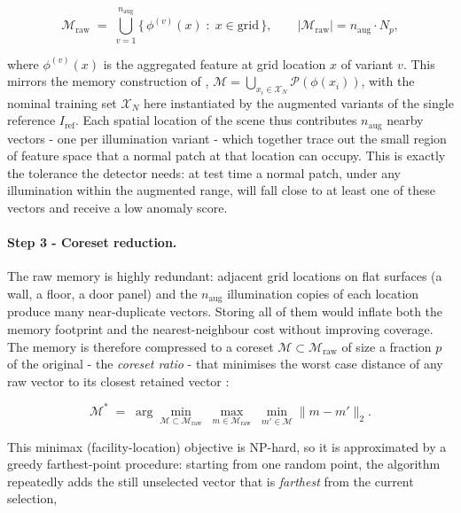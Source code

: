\begin{equation}
  \mathcal{M}_{\mathrm{raw}} \;=\;
  \bigcup_{v=1}^{n_{\mathrm{aug}}} \big\{\, \phi^{(v)}(x) \;:\; x \in \text{grid} \,\big\},
  \qquad
  |\mathcal{M}_{\mathrm{raw}}| = n_{\mathrm{aug}} \cdot N_p ,
  \label{eq:rawmemory}
\end{equation}

where $\phi^{(v)}(x)$ is the aggregated feature at grid location $x$ of variant
$v$. This mirrors the memory construction of \cite{Roth2022},
$\mathcal{M} = \bigcup_{x_i \in \mathcal{X}_N} \mathcal{P}(\phi(x_i))$, with the
nominal training set $\mathcal{X}_N$ here instantiated by the augmented variants
of the single reference $I_{\mathrm{ref}}$. Each spatial location of the scene
thus contributes $n_{\mathrm{aug}}$ nearby vectors - one per illumination variant -
which together trace out the small region of feature space that a normal patch at
that location can occupy. This is exactly the tolerance the detector needs: at
test time a normal patch, under any illumination within the augmented range, will
fall close to at least one of these vectors and receive a low anomaly score.

\paragraph{Step 3 - Coreset reduction.} The raw memory is highly redundant:
adjacent grid locations on flat surfaces (a wall, a floor, a door panel) and the
$n_{\mathrm{aug}}$ illumination copies of each location produce many near-duplicate
vectors. Storing all of them would inflate both the memory footprint and the
nearest-neighbour cost without improving coverage. The memory is therefore
compressed to a coreset $\mathcal{M} \subset \mathcal{M}_{\mathrm{raw}}$ of size a
fraction $p$ of the original - the \emph{coreset ratio} - that minimises the worst
case distance of any raw vector to its closest retained vector
\cite{SenerSavarese2018,Roth2022}:

\begin{equation}
  \mathcal{M}^{\ast} \;=\;
  \arg\min_{\mathcal{M} \subset \mathcal{M}_{\mathrm{raw}}}
  \; \max_{m \in \mathcal{M}_{\mathrm{raw}}}
  \; \min_{m' \in \mathcal{M}} \lVert m - m' \rVert_2 .
  \label{eq:coreset-obj}
\end{equation}

This minimax (facility-location) objective is NP-hard, so it is approximated by a
greedy farthest-point procedure: starting from one random point, the algorithm
repeatedly adds the still unselected vector that is \emph{farthest} from the
current selection,

